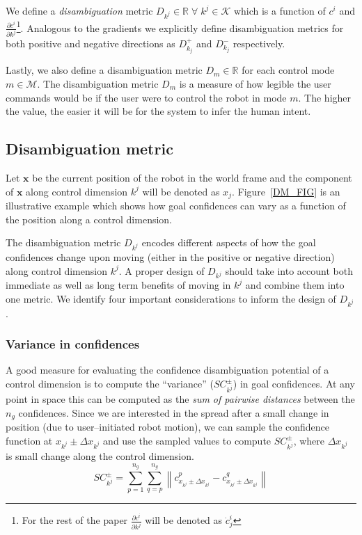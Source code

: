 \documentclass[conference]{IEEEtran}
\newcommand{\norm}[1]{\left\lVert#1\right\rVert}
\begin{document}
We define a \textit{disambiguation} metric  $D_{k^j}\in \mathbb{R}\; \forall \;k^j \in \mathcal{K}$ which is a function of $c^i$ and $\frac{\partial c^i}{\partial k^j}$\footnote{For the rest of the paper $\frac{\partial c^i}{\partial k^j}$ will be denoted as $ \dot{c}^{i}_j$}. Analogous to the gradients we explicitly define disambiguation metrics for both positive and negative directions as $D_{k_j}^{+}$ and $D_{k_j}^{-}$ respectively.

Lastly, we also define a disambiguation metric $D_m \in \mathbb{R}$ for each control mode $m \in \mathcal{M}$.
The disambiguation metric $D_m$ is a measure of how legible the user commands would be if the user were to control the robot in mode $m$. The higher the value, the easier it will be for the system to infer the human intent. 

\subsection{Disambiguation metric}\label{DM}
Let $\boldsymbol{x}$ be the current position of the robot in the world frame and the component of $\boldsymbol{x}$ along control dimension $k^j$ will be denoted as $x_{j}$. 
Figure~\ref{DM_FIG} is an illustrative example which shows how goal confidences can vary as a function of the position along a control dimension. 

The disambiguation metric $D_{k^j}$ encodes different aspects of how the goal confidences change upon moving (either in the positive or negative direction) along control dimension $k^j$. A proper design of $D_{k^j}$ should take into account both immediate as well as long term benefits of moving in $k^j$ and combine them into one metric. We identify four important considerations to  inform the design of $D_{k^j}$.

\subsubsection{Variance in confidences}
A good measure for evaluating the confidence disambiguation potential of a control dimension is to compute the ``variance'' ($SC^{\pm}_{k^j}$) in goal confidences. At any point in space this can be computed as the \textit{sum of pairwise distances} between the $n_g$ confidences. Since we are interested in the spread after a small change in position (due to user--initiated robot motion), we can sample the confidence function at $x_{k^j}\pm\Delta x_{k^j}$ and use the sampled values to compute $SC^{\pm}_{k^j}$, where $\Delta x_{k^j}$ is small change along the control dimension.
\begin{equation*}
SC^{\pm}_{k^j} = \sum_{p=1}^{n_g}\sum_{q=p}^{n_g}\norm{c^{p}_{x_{k^j} \pm \Delta x_{k^j}} - c^{q}_{x_{k^j} \pm \Delta x_{k^j}} }
\end{equation*}
\end{document}
